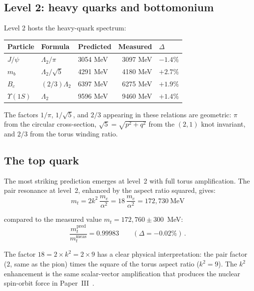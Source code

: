 \documentclass[11pt,a4paper]{article}
\begin{document}
\subsection{Level 2: heavy quarks and bottomonium}
\label{sec:level2}

Level 2 hosts the heavy-quark spectrum:
\begin{center}
\begin{tabular}{lllrl}
\toprule
Particle & Formula & Predicted & Measured & $\Delta$ \\
\midrule
$J/\psi$ & $\Lambda_2/\pi$ & 3054 MeV & 3097 MeV & $-1.4\%$ \\
$m_b$ & $\Lambda_2/\sqrt{5}$ & 4291 MeV & 4180 MeV & $+2.7\%$ \\
$B_c$ & $(2/3)\Lambda_2$ & 6397 MeV & 6275 MeV & $+1.9\%$ \\
$\Upsilon(1S)$ & $\Lambda_2$ & 9596 MeV & 9460 MeV & $+1.4\%$ \\
\bottomrule
\end{tabular}
\end{center}

The factors $1/\pi$, $1/\sqrt{5}$, and $2/3$ appearing in these
relations are geometric: $\pi$ from the circular cross-section,
$\sqrt{5} = \sqrt{p^2 + q^2}$ from the $(2,1)$ knot invariant, and
$2/3$ from the torus winding ratio.


\subsection{The top quark}
\label{sec:top}

The most striking prediction emerges at level~2 with full torus
amplification.  The pair resonance at level~2, enhanced by the
aspect ratio squared, gives:
\begin{equation}
  \boxed{m_t = 2k^2\,\frac{m_e}{\alpha^2}
  = 18\,\frac{m_e}{\alpha^2} = 172{,}730~\text{MeV}}
  \label{eq:mt}
\end{equation}

compared to the measured value $m_t = 172{,}760 \pm 300$~MeV:
\begin{equation}
  \frac{m_t^{\text{pred}}}{m_t^{\text{meas}}} = 0.99983
  \qquad (\Delta = -0.02\%)\,.
  \label{eq:mt_accuracy}
\end{equation}

The factor $18 = 2 \times k^2 = 2 \times 9$ has a clear physical
interpretation: the pair factor ($2$, same as the pion) times the
square of the torus aspect ratio ($k^2 = 9$).  The $k^2$ enhancement
is the same scalar-vector amplification that produces the nuclear
spin-orbit force in Paper~III~\cite{paper3}.
\end{document}
